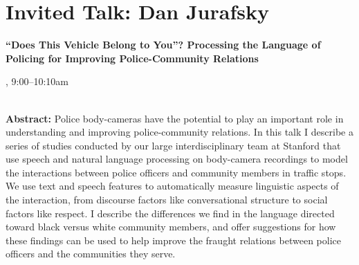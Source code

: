 \section{Invited Talk: Dan Jurafsky}

\begin{center}
\begin{Large}
{\bfseries\Large ``Does This Vehicle Belong to You''? Processing the Language of Policing for Improving Police-Community Relations}\vspace{1em}\par
\end{Large}


\daydateyear, 9:00--10:10am \vspace{1em}\\
\PlenaryLoc \\
\vspace{1em}\par
\end{center}

\noindent
{\bfseries Abstract:} Police body-cameras have the potential to play an important
role in understanding and improving police-community relations.
In this talk I describe a series of studies conducted by our
large interdisciplinary team at Stanford that use speech and
natural language processing on body-camera recordings to model the interactions
between police officers and community members in traffic stops.
We use text and speech features to automatically measure linguistic aspects of the interaction,
from discourse factors like conversational structure to social factors like respect.
I describe the differences we find in the language directed toward black versus white community members,
and offer suggestions for how these findings can be used to help improve the fraught relations between
police officers and the communities they serve.

\vspace{3em}\par 

